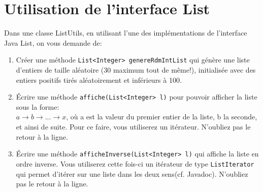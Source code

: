 \documentclass[iutinfo,a4paper,nocorrections,10pt]{ustl-tdtp}
\date{\annee{2018}--\annee{2019}}
\begin{document}
\maketitle
\thispagestyle{empty}


\sloppy
\section{Utilisation de l'interface List}

Dans une classe ListUtils, en utilisant l'une des implémentations de l'interface Java List, on vous demande de:
\begin{enumerate}
\item Créer une méthode \texttt{List<Integer> genereRdmIntList} qui génère une liste d'entiers de taille aléatoire (30 maximum tout de même!), initialisée avec des entiers positifs tirés aléatoirement et inférieurs à 100.

\item Écrire une méthode \texttt{affiche(List<Integer> l)} pour pouvoir afficher la liste sous la forme:\\
$a \rightarrow b \rightarrow ...\rightarrow x$, où a est la valeur du premier entier de la liste, b la seconde, et ainsi de suite. Pour ce faire, vous utiliserez un itérateur. N'oubliez pas le retour à la ligne.

\item Écrire une méthode \texttt{afficheInverse(List<Integer> l)} qui affiche la liste en ordre inverse. Vous utiliserez cette fois-ci un itérateur de type \texttt{ListIterator} qui permet d'itérer sur une liste dans les deux sens(cf. Javadoc). N'oubliez pas le retour à la ligne.


\end{enumerate}
\end{document}
